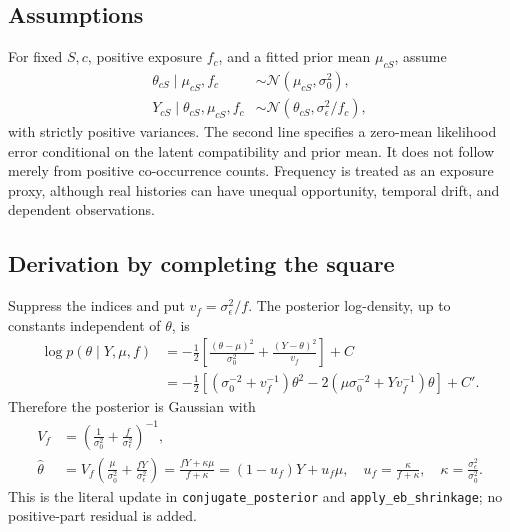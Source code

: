 \documentclass[11pt,a4paper]{article}
\theoremstyle{remark}
\newcommand{\code}[1]{\texttt{\small #1}}
\begin{document}
\subsection{Assumptions}
For fixed $S,c$, positive exposure $f_c$, and a fitted prior mean $\mu_{cS}$,
assume
\begin{align}
 \theta_{cS}\mid\mu_{cS},f_c
   &\sim\mathcal N(\mu_{cS},\sigma_0^2),\\
 Y_{cS}\mid\theta_{cS},\mu_{cS},f_c
   &\sim\mathcal N(\theta_{cS},\sigma_\epsilon^2/f_c),
 \label{eq:hierarchy}
\end{align}
with strictly positive variances. The second line specifies a zero-mean
likelihood error conditional on the latent compatibility and prior mean.
It does not follow merely from positive co-occurrence counts. Frequency
is treated as an exposure proxy, although real histories can have unequal
opportunity, temporal drift, and dependent observations.

\subsection{Derivation by completing the square}
Suppress the indices and put $v_f=\sigma_\epsilon^2/f$. The posterior
log-density, up to constants independent of $\theta$, is
\begin{align}
 \log p(\theta\mid Y,\mu,f)
 &=-\frac12\left[\frac{(\theta-\mu)^2}{\sigma_0^2}
                 +\frac{(Y-\theta)^2}{v_f}\right]+C\\
 &=-\frac12\left[(\sigma_0^{-2}+v_f^{-1})\theta^2
       -2(\mu\sigma_0^{-2}+Yv_f^{-1})\theta\right]+C'.
\end{align}
Therefore the posterior is Gaussian with
\begin{align}
 V_f&=\left(\frac1{\sigma_0^2}+\frac f{\sigma_\epsilon^2}\right)^{-1},
 \label{eq:postvar}\\
 \widehat\theta
 &=V_f\left(\frac\mu{\sigma_0^2}+\frac{fY}{\sigma_\epsilon^2}\right)
 =\frac{fY+\kappa\mu}{f+\kappa}
 =(1-u_f)Y+u_f\mu,\quad
 u_f=\frac\kappa{f+\kappa},\quad
 \kappa=\frac{\sigma_\epsilon^2}{\sigma_0^2}.
 \label{eq:posterior}
\end{align}
This is the literal update in \code{conjugate\_posterior} and
\code{apply\_eb\_shrinkage}; no positive-part residual is added.
\end{document}

